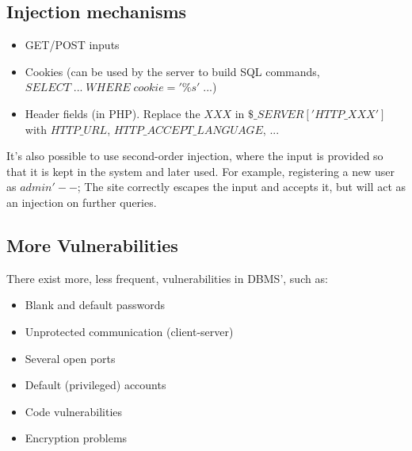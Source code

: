 \documentclass[10pt,a4paper]{report}
\begin{document}
\subsection{Injection mechanisms}
\begin{itemize}
\item GET/POST inputs
\item Cookies (can be used by the server to build SQL commands, $SELECT \; ... \; WHERE \; cookie='\%s'\; ...$)
\item Header fields (in PHP). Replace the $XXX$ in $\$\_SERVER['HTTP\_XXX']$ with $HTTP\_URL$, $HTTP\_ACCEPT\_LANGUAGE$, ...
\end{itemize}
It's also possible to use second-order injection, where the input is provided so that it is kept in the system and later used. For example, registering a new user as $admin'--$; The site correctly escapes the input and accepts it, but will act as an injection on further queries.
\subsection{More Vulnerabilities}
There exist more, less frequent, vulnerabilities in DBMS', such as:
\begin{itemize}
\item Blank and default passwords
\item Unprotected communication (client-server)
\item Several open ports
\item Default (privileged) accounts
\item Code vulnerabilities
\item Encryption problems
\end{itemize}
\end{document}
